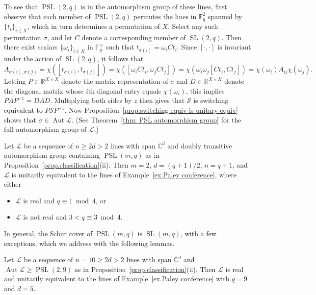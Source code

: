 \begin{example}
To see that $\operatorname{PSL}(2,q)$ is in the automorphism group of these lines, first observe that each member of $\operatorname{PSL}(2,q)$ permutes the lines in $\mathbb{F}_q^2$ spanned by $\{t_i\}_{i\in X}$, which in turn determines a permutation of $X$.
Select any such permutation $\sigma$, and let $C$ denote a corresponding member of $\operatorname{SL}(2,q)$.
Then there exist scalars $\{\omega_i\}_{i\in X}$ in $\mathbb{F}_q^\times$ such that $t_{\sigma(i)}=\omega_iCt_i$.
Since $[\cdot,\cdot]$ is invariant under the action of $\operatorname{SL}(2,q)$, it follows that
\[
A_{\sigma(i),\sigma(j)}
=\chi([t_{\sigma(i)},t_{\sigma(j)}])
=\chi([\omega_iCt_i,\omega_jCt_j])
=\chi(\omega_i\omega_j[Ct_i,Ct_j])
=\chi(\omega_i) A_{ij} \chi(\omega_j).
\]
Letting $P\in\mathbb{R}^{X\times X}$ denote the matrix representation of $\sigma$ and $D\in\mathbb{R}^{X\times X}$ denote the diagonal matrix whose $i$th diagonal entry equals $\chi(\omega_i)$, this implies $PAP^{-1}=DAD$.
Multiplying both sides by $z$ then gives that $\mathcal{S}$ is switching equivalent to $P\mathcal{S}P^{-1}$.
Now Proposition~\ref{prop:switching equiv is unitary equiv} shows that $\sigma\in \operatorname{Aut} \mathscr{L}$.
(See Theorem~\ref{thm: PSL automorphism group} for the full automorphism group of $\mathscr{L}$.)
\end{example}


\begin{theorem}
\label{thm.linear groups}
Let $\mathscr{L}$ be a sequence of $n\geq 2d > 2$ lines with span $\mathbb{C}^d$ and doubly transitive automorphism group containing $\operatorname{PSL}(m,q)$ as in Proposition~\ref{prop.classification}(ii).
Then $m=2$, $d = (q+1)/2$, $n = q+1$, and $\mathscr{L}$ is unitarily equivalent to the lines of Example~\ref{ex.Paley conference}, where either
\begin{itemize}
\item[(a)]
$\mathscr{L}$ is real and $q\equiv1\bmod4$, or
\item[(b)]
$\mathscr{L}$ is not real and $3 < q\equiv3\bmod4$.
\end{itemize}
\end{theorem}

In general, the Schur cover of $\operatorname{PSL}(m,q)$ is $\operatorname{SL}(m,q)$, with a few exceptions, which we address with the following lemmas.

\begin{lemma}
\label{lem.PSL29}
Let $\mathscr{L}$ be a sequence of $n=10 \geq 2d > 2$ lines with span $\mathbb{C}^d$ and $\operatorname{Aut} \mathscr{L} \geq \operatorname{PSL}(2,9)$ as in Proposition~\ref{prop.classification}(ii).
Then $\mathscr{L}$ is real and unitarily equivalent to the lines of Example~\ref{ex.Paley conference} with $q = 9$ and $d = 5$.
\end{lemma}

